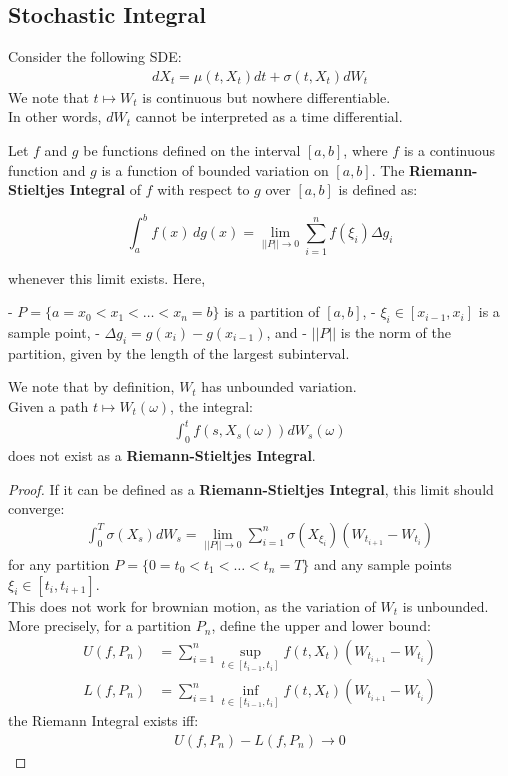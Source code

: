 \subsection{Stochastic Integral}
Consider the following SDE:
\begin{align*}
    dX_t = \mu(t, X_t)dt + \sigma(t, X_t)dW_t
\end{align*}
We note that $t \mapsto W_t$ is continuous but nowhere differentiable.\\
In other words, $d W_t$ cannot be interpreted as a time differential.
\\
\begin{definition}
Let $f$ and $g$ be functions defined on the interval $[a, b]$, where $f$ is a continuous function and $g$ is a function of bounded variation on $[a, b]$. 
The \textbf{Riemann-Stieltjes Integral}  of $f$ with respect to $g$ over $[a, b]$ is defined as:

\[
\int_a^b f(x) \, dg(x) = \lim_{||P|| \to 0} \sum_{i=1}^{n} f(\xi_i) \Delta g_i
\]

whenever this limit exists. Here, 

- $P = \{ a = x_0 < x_1 < \dots < x_n = b \}$ is a partition of $[a, b]$,
- $\xi_i \in [x_{i-1}, x_i]$ is a sample point,
- $\Delta g_i = g(x_i) - g(x_{i-1})$, and
- $||P||$ is the norm of the partition, given by the length of the largest subinterval.
\end{definition}

We note that by definition, $W_t$ has unbounded variation.\\
Given a path $t \mapsto W_t(\omega)$, the integral:
\begin{align*}
    \int_0^t f(s, X_s(\omega))dW_s(\omega)
\end{align*}
does not exist as a \textbf{Riemann-Stieltjes Integral}.
\begin{proof}
    If it can be defined as a \textbf{Riemann-Stieltjes Integral}, this limit should converge:
    \begin{align*}
        \int_0^T \sigma(X_s)dW_s = \lim_{||P|| \to 0} \sum_{i=1}^{n} \sigma(X_{\xi_i}) (W_{t_{i+1}} - W_{t_{i}})
    \end{align*}
    for any partition $P = \{0 = t_0 < t_1 < \dots < t_n = T\}$ and any sample points $\xi_i \in [t_{i}, t_{i+1}]$.\\
    This does not work for brownian motion, as the variation of $W_t$ is unbounded.\\
    More precisely,  for a partition $P_n$, define the upper and lower bound:
    \begin{align*}
        U(f, P_n) &= \sum_{i=1}^{n} \sup_{t \in [t_{i-1}, t_i]} f(t, X_t) (W_{t_{i+1}} - W_{t_{i}})\\
        L(f, P_n) &= \sum_{i=1}^{n} \inf_{t \in [t_{i-1}, t_i]} f(t, X_t) (W_{t_{i+1}} - W_{t_{i}})
    \end{align*}
    the Riemann Integral exists iff:
    \begin{align*}
        U(f, P_n) - L(f, P_n) \to 0
    \end{align*}
\end{proof}

